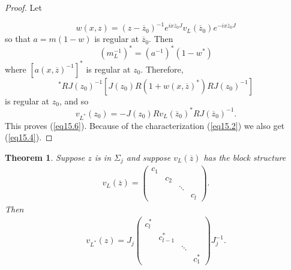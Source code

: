 \documentclass{surv-l}
\theoremstyle{plain}
\newtheorem{theorem}{Theorem}[section]
\theoremstyle{definition}
\numberwithin{equation}{chapter}
\begin{document}
\begin{proof}
Let

\begin{equation*}
w(x, z)=(z-\overline{z}_{0})^{-1}e^{ix\overline{z}_{0}J}v_{L}(\overline{z}_{0})e^{-ix\overline{z}_{0}J}
\end{equation*}
so that $a=m(1-w)$ is regular at $\overline{z}_{0}$. Then
\begin{equation*}
(m_{L}^{-1})^{*}=(a^{-1})^{*}(1-w^{*})
\end{equation*}
where $[a(x,\overline{z})^{-1}]^{*}$ is regular at $z_{0}$. Therefore,
\begin{equation*}
[m_{L}(x,\overline{z})^{-1}]^{*}RJ(z_{0})^{-1}[J(z_{0})R(1+w(x, \overline{z})^{*})RJ(z_{0})^{-1}]
\end{equation*}
is regular at $z_{0}$, and so
\setcounter{equation}{6}
\begin{equation}\label{eq15.7}
v_{L^{*}} (z_{0})=-J(z_{0})Rv_{L}(\overline{z}_{0})^{*}RJ(\overline{z}_{0})^{-1}.
\end{equation}
This proves (\ref{eq15.6}). Because of the characterization (\ref{eq15.2}) we also get (\ref{eq15.4}).
\end{proof}
\setcounter{theorem}{7}
\begin{theorem}\label{thm15.8}
Suppose $z$  is in $\Sigma_{j}$  and suppose $v_{L}(\overline{z})$  has the block structure
\setcounter{equation}{8}
\begin{align}\label{eq15.9}
v_{L}(\overline{z})=\left(\begin{array}{llll}
c_{1}&&&\\
&c_{2}&& \\
& & \ddots&\\
& & & c_{l}\end{array}\right).
\end{align}
Then
\begin{align}\label{eq15.10}
v_{L^{*}}(z)=J_{j}\left(\begin{array}{llll}
c^{*}_{l}&&&\\
&c^{*}_{l-1}&& \\
& & \ddots&\\
& & & c^{*}_{1}\end{array}\right)J_{j}^{-1}.
\end{align}
\end{theorem}
\end{document}
